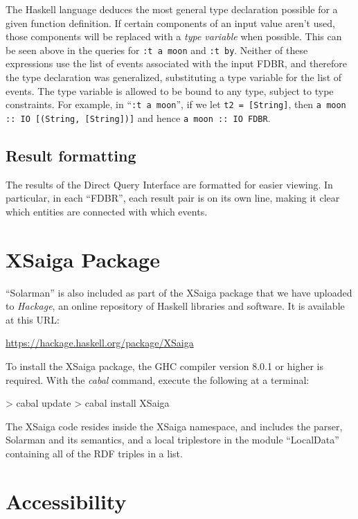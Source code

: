 \documentclass[../main.tex]{subfiles}
\begin{document}
The Haskell language deduces the most general type declaration possible for a given function definition.  If certain components of an input value aren't used,
those components will be replaced with a {\em type variable} when possible.  This can be seen above in the queries for \texttt{:t a moon} and \texttt{:t by}.
Neither of these expressions use the list of events associated with the input FDBR, and therefore the type declaration was generalized,
substituting a type variable for the list of events.  The type variable is allowed to be bound to any type, subject to type constraints.
For example, in ``\texttt{:t a moon}'', if we let \texttt{t2 = [String]}, then \texttt{a moon :: IO [(String, [String])]} and hence \texttt {a moon :: IO FDBR}.

\subsection{Result formatting}

The results of the Direct Query Interface are formatted for easier viewing.  In particular, in each ``FDBR'', each result pair is on its own line, making
it clear which entities are connected with which events.

\section{XSaiga Package}

``Solarman'' is also included as part of the XSaiga package that we have uploaded to {\em Hackage}, an online repository of Haskell libraries and software\cite{XSaiga:2016}.
It is available at this URL:

\url{https://hackage.haskell.org/package/XSaiga}

To install the XSaiga package, the GHC compiler version 8.0.1 or higher is required.  With the {\em cabal} command, execute the following at a terminal:

\begin{code}
	> cabal update
	> cabal install XSaiga
\end{code}

The XSaiga code resides inside the XSaiga namespace, and includes the parser, Solarman and its semantics, and a local triplestore in the module ``LocalData'' containing
all of the RDF triples in a list.  

\section{Accessibility}
\end{document}
